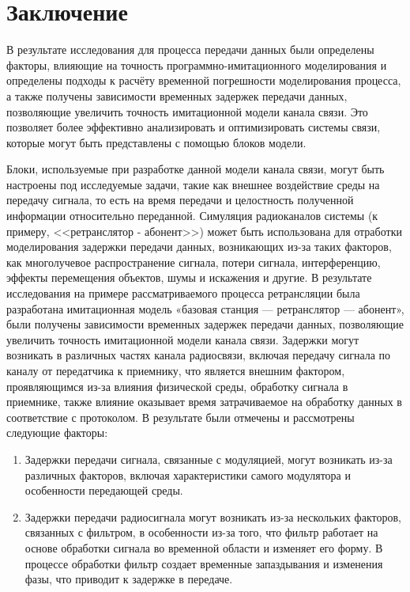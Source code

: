 \chapter*{\centering\large{Заключение}}
    \label{sec:Chapter4} 

 \begin{onehalfspace}
В результате исследования для процесса передачи данных были определены факторы, влияющие на точность программно-имитационного моделирования и определены подходы к расчёту временной погрешности моделирования процесса, а также получены зависимости временных задержек передачи данных, позволяющие увеличить точность имитационной модели канала связи. Это позволяет более эффективно анализировать и оптимизировать системы связи, которые могут быть представлены с помощью блоков модели.

Блоки, используемые при разработке данной модели канала связи, могут быть настроены под исследуемые задачи, такие как внешнее воздействие среды на передачу сигнала, то есть на время передачи и целостность полученной информации относительно переданной. Симуляция радиоканалов системы (к примеру, <<ретранслятор - абонент>>) может быть использована для отработки моделирования задержки передачи данных, возникающих из-за таких факторов, как многолучевое распространение сигнала, потери сигнала, интерференцию, эффекты перемещения объектов, шумы и искажения и другие.
В результате исследования на примере рассматриваемого процесса ретрансляции была разработана имитационная модель «базовая станция — ретранслятор — абонент», были получены зависимости временных задержек передачи данных, позволяющие увеличить точность имитационной модели канала связи. Задержки могут возникать в различных частях канала радиосвязи, включая передачу сигнала по каналу от передатчика к приемнику, что является внешним фактором, проявляющимся из-за влияния физической среды, обработку сигнала в приемнике, также влияние оказывает время затрачиваемое на обработку данных в соответствие с протоколом. В результате были отмечены и рассмотрены следующие факторы:
 	
	\begin{enumerate} 	
	\item	Задержки передачи сигнала, связанные с модуляцией, могут возникать из-за различных факторов, включая характеристики самого модулятора и особенности передающей среды.
	
	\item	Задержки передачи радиосигнала могут возникать из-за нескольких факторов, связанных с фильтром, в особенности из-за того, что фильтр работает на основе обработки сигнала во временной области и изменяет его форму. В процессе обработки фильтр создает временные запаздывания и изменения фазы, что приводит к задержке в передаче. 



\end{enumerate}
\end{onehalfspace}
